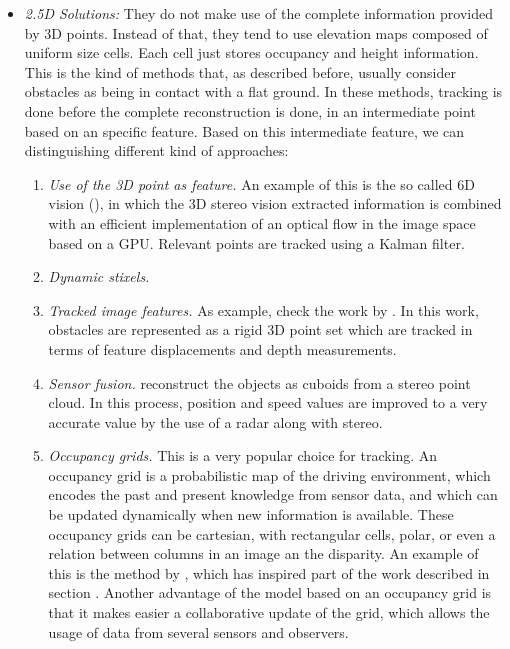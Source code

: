 \begin{itemize}
 \item \emph{2.5D Solutions:} They do not make use of the complete information provided by 3D points. Instead of that, they tend to use elevation maps composed of uniform size cells. Each cell just stores occupancy and height information. This is the kind of methods that, as described before, usually consider obstacles as being in contact with a flat ground.
 In these methods, tracking is done before the complete reconstruction is done, in an intermediate point based on an specific feature. Based on this intermediate feature, we can distinguishing different kind of approaches:
  \begin{enumerate}
   \item \emph{Use of the 3D point as feature.} An example of this is the so called 6D vision (\cite{franke20056d}), in which the 3D stereo vision extracted information is combined with an efficient implementation of an optical flow in the image space based on a \acf{GPU}. Relevant points are tracked using a Kalman filter.
   \item \emph{Dynamic stixels.} 
   \item \emph{Tracked image features.} As example, check the work by \cite{barth2009estimating}. In this work, obstacles are represented as a rigid 3D point set which are tracked in terms of feature displacements and depth measurements.
   \item \emph{Sensor fusion.} \cite{wu2009collision} reconstruct the objects as cuboids from a stereo point cloud. In this process, position and speed values are improved to a very accurate value by the use of a radar along with stereo.
   \item \emph{Occupancy grids.} This is a very popular choice for tracking. An occupancy grid is a probabilistic map of the driving environment, which encodes the past and present knowledge from sensor data, and which can be updated dynamically when new information is available. These occupancy grids can be cartesian, with rectangular cells, polar, or even a relation between columns in an image an the disparity. An example of this is the method by \cite{danescu2012particle}, which has inspired part of the work described in section \todo { \ref{XXX}}.
   Another advantage of the model based on an occupancy grid is that it makes easier a collaborative update of the grid, which allows the usage of data from several sensors and observers.

\end{enumerate}
\end{itemize}
